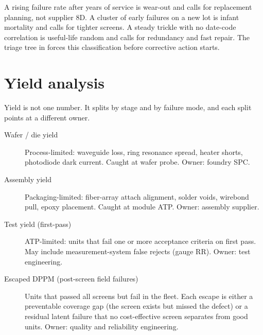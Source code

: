 A rising failure rate after years of service is wear-out and calls for replacement
planning, not supplier 8D. A cluster of early failures on a new lot is infant
mortality and calls for tighter screens. A steady trickle with no date-code
correlation is useful-life random and calls for redundancy and fast repair. The
triage tree in  forces this classification before
corrective action starts.

\section{Yield analysis}
\label{sec:yield-analysis}

Yield is not one number. It splits by stage and by failure mode, and each split
points at a different owner.

\begin{description}
\item[Wafer / die yield] Process-limited: waveguide loss, ring resonance spread,
      heater shorts, photodiode dark current. Caught at wafer probe. Owner: foundry
      SPC.
\item[Assembly yield] Packaging-limited: fiber-array attach alignment, solder voids,
      wirebond pull, epoxy placement. Caught at module ATP. Owner: assembly supplier.
\item[Test yield (first-pass)] ATP-limited: units that fail one or more acceptance
      criteria on first pass. May include measurement-system false rejects (gauge
      RR). Owner: test engineering.
\item[Escaped DPPM (post-screen field failures)] Units that passed all screens but
      fail in the fleet. Each escape is either a preventable coverage gap (the
      screen exists but missed the defect) or a residual latent failure that no
      cost-effective screen separates from good units. Owner: quality and
      reliability engineering.
\end{description}

